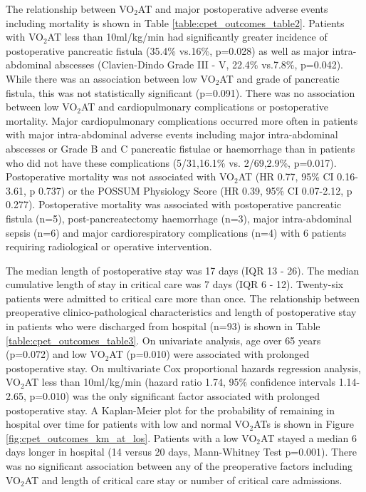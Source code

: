 The relationship between VO$_2$AT and major postoperative adverse events including mortality is shown in Table \ref{table:cpet_outcomes_table2}. Patients with VO$_2$AT less than 10ml/kg/min had significantly greater incidence of postoperative pancreatic fistula (35.4\% vs.16\%, p=0.028) as well as major intra-abdominal abscesses (Clavien-Dindo Grade III - V, 22.4\% vs.7.8\%, p=0.042). While there was an association between low VO$_2$AT and grade of pancreatic fistula, this was not statistically significant (p=0.091). There was no association between low VO$_2$AT and cardiopulmonary complications or postoperative mortality. Major cardiopulmonary complications occurred more often in patients with major intra-abdominal adverse events including major intra-abdominal abscesses or Grade B and C pancreatic fistulae or haemorrhage than in patients who did not have these complications (5/31,16.1\% vs. 2/69,2.9\%, p=0.017). Postoperative mortality was not associated with VO$_2$AT (HR 0.77, 95\% CI 0.16-3.61, p 0.737) or the POSSUM Physiology Score (HR 0.39, 95\% CI 0.07-2.12, p 0.277). Postoperative mortality was associated with postoperative pancreatic fistula (n=5), post-pancreatectomy haemorrhage (n=3), major intra-abdominal sepsis (n=6) and major cardiorespiratory complications (n=4) with 6 patients requiring radiological or operative intervention.



The median length of postoperative stay was 17 days (IQR 13 - 26). The median cumulative length of stay in critical care was 7 days (IQR 6 - 12). Twenty-six patients were admitted to critical care more than once. The relationship between preoperative clinico-pathological characteristics and length of postoperative stay in patients who were discharged from hospital (n=93) is shown in Table \ref{table:cpet_outcomes_table3}. On univariate analysis, age over 65 years (p=0.072) and low VO$_2$AT (p=0.010) were associated with prolonged postoperative stay. On multivariate Cox proportional hazards regression analysis, VO$_2$AT less than 10ml/kg/min (hazard ratio 1.74, 95\% confidence intervals 1.14-2.65, p=0.010) was the only significant factor associated with prolonged postoperative stay. A Kaplan-Meier plot for the probability of remaining in hospital over time for patients with low and normal VO$_2$ATs is shown in Figure \ref{fig:cpet_outcomes_km_at_los}. Patients with a low VO$_2$AT stayed a median 6 days longer in hospital (14 versus 20 days, Mann-Whitney Test p=0.001). There was no significant association between any of the preoperative factors including VO$_2$AT and length of critical care stay or number of critical care admissions.


